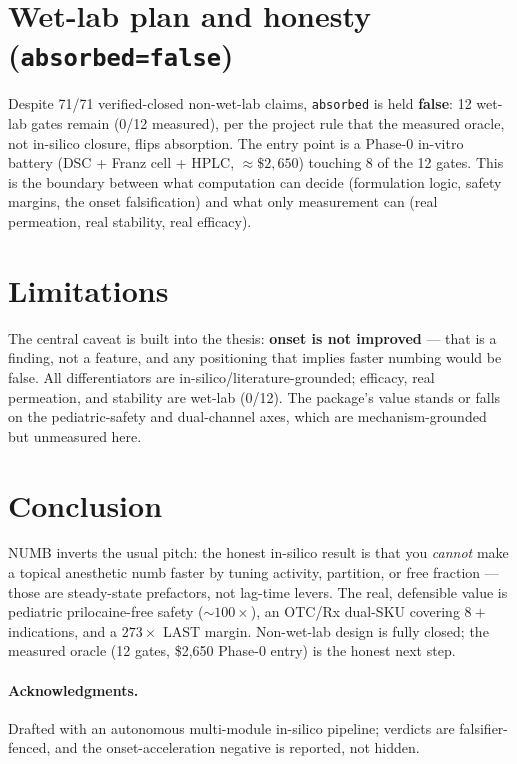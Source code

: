 \documentclass[11pt,a4paper]{article}
\begin{document}
\section{Wet-lab plan and honesty (\texttt{absorbed=false})}
\label{sec:wetlab}
Despite 71/71 verified-closed non-wet-lab claims, \texttt{absorbed} is held
\textbf{false}: 12 wet-lab gates remain (0/12 measured), per the project rule
that the measured oracle, not in-silico closure, flips absorption. The entry
point is a Phase-0 in-vitro battery (DSC + Franz cell + HPLC, $\approx \$2{,}650$)
touching 8 of the 12 gates. This is the boundary between what computation can
decide (formulation logic, safety margins, the onset falsification) and what
only measurement can (real permeation, real stability, real efficacy).

\section{Limitations}
\label{sec:limits}
The central caveat is built into the thesis: \textbf{onset is not improved} ---
that is a finding, not a feature, and any positioning that implies faster
numbing would be false. All differentiators are in-silico/literature-grounded;
efficacy, real permeation, and stability are wet-lab (0/12). The package's value
stands or falls on the pediatric-safety and dual-channel axes, which are
mechanism-grounded but unmeasured here.

\section{Conclusion}
\label{sec:conclusion}
NUMB inverts the usual pitch: the honest in-silico result is that you
\emph{cannot} make a topical anesthetic numb faster by tuning activity,
partition, or free fraction --- those are steady-state prefactors, not lag-time
levers. The real, defensible value is pediatric prilocaine-free safety
($\sim 100\times$), an OTC/Rx dual-SKU covering $8+$ indications, and a
$273\times$ LAST margin. Non-wet-lab design is fully closed; the measured oracle
(12 gates, \$2{,}650 Phase-0 entry) is the honest next step.

\paragraph{Acknowledgments.}
Drafted with an autonomous multi-module in-silico pipeline; verdicts are
falsifier-fenced, and the onset-acceleration negative is reported, not hidden.
\end{document}
